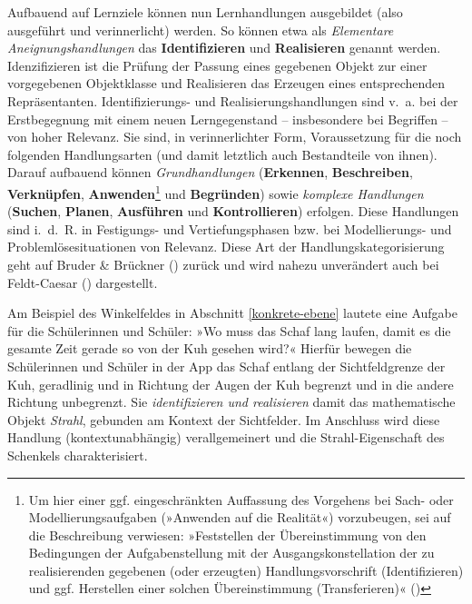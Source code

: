 \documentclass[
]{scrbook}
\renewenvironment{quote}{
  \list{}{
	\leftmargin0.2cm   %
    \rightmargin\leftmargin
      	\def\FrameCommand
    {%
        {\color{quoteColor}\vrule width 2pt}%
        \hspace{0pt}%
    }%
    \MakeFramed{\advance \hsize -\width \FrameRestore}    \color{quoteColor}
    }
  \item\relax
}
{\endlist\color{black}\endMakeFramed}
\theoremstyle{definition}
\theoremstyle{definition}
\theoremstyle{definition}
\theoremstyle{definition}
\theoremstyle{remark}
\begin{document}
Aufbauend auf Lernziele können nun Lernhandlungen ausgebildet (also ausgeführt und verinnerlicht) werden. So können etwa als \emph{Elementare Aneignungshandlungen} das \textbf{Identifizieren} und \textbf{Realisieren} genannt werden. Idenzifizieren ist die Prüfung der Passung eines gegebenen Objekt zur einer vorgegebenen Objektklasse und Realisieren das Erzeugen eines entsprechenden Repräsentanten. Identifizierungs- und Realisierungshandlungen sind v.~a. bei der Erstbegegnung mit einem neuen Lerngegenstand -- insbesondere bei Begriffen -- von hoher Relevanz. Sie sind, in verinnerlichter Form, Voraussetzung für die noch folgenden Handlungsarten (und damit letztlich auch Bestandteile von ihnen).
Darauf aufbauend können \emph{Grundhandlungen} (\textbf{Erkennen}, \textbf{Beschreiben}, \textbf{Verknüpfen}, \textbf{Anwenden}\footnote{Um hier einer ggf. eingeschränkten Auffassung des Vorgehens bei Sach- oder Modellierungsaufgaben (»Anwenden auf die Realität«) vorzubeugen, sei auf die Beschreibung verwiesen: »Feststellen der Übereinstimmung von den Bedingungen der Aufgabenstellung mit der Ausgangskonstellation der zu realisierenden gegebenen (oder erzeugten) Handlungsvorschrift (Identifizieren) und ggf. Herstellen einer solchen Übereinstimmung (Transferieren)« ()} und \textbf{Begründen}) sowie \emph{komplexe Handlungen} (\textbf{Suchen}, \textbf{Planen}, \textbf{Ausführen} und \textbf{Kontrollieren}) erfolgen. Diese Handlungen sind i.~d.~R. in Festigungs- und Vertiefungsphasen bzw. bei Modellierungs- und Problemlösesituationen von Relevanz. Diese Art der Handlungskategorisierung geht auf Bruder \& Brückner () zurück und wird nahezu unverändert auch bei Feldt-Caesar () dargestellt.



\begin{quote}
Am Beispiel des Winkelfeldes in Abschnitt \ref{konkrete-ebene} lautete eine Aufgabe für die Schülerinnen und Schüler: »Wo muss das Schaf lang laufen, damit es die gesamte Zeit gerade so von der Kuh gesehen wird?« Hierfür bewegen die Schülerinnen und Schüler in der App das Schaf entlang der Sichtfeldgrenze der Kuh, geradlinig und in Richtung der Augen der Kuh begrenzt und in die andere Richtung unbegrenzt. Sie \emph{identifizieren und realisieren} damit das mathematische Objekt \emph{Strahl}, gebunden am Kontext der Sichtfelder. Im Anschluss wird diese Handlung (kontextunabhängig) verallgemeinert und die Strahl-Eigenschaft des Schenkels charakterisiert.
\end{quote}
\end{document}
